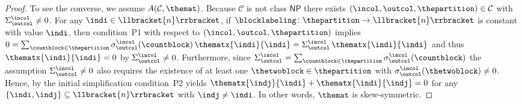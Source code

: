 \documentclass[10pt,a4paper]{amsart}
\numberwithin{equation}{section}
\newcommand{\dwi}[1]{\llbracket{#1}\rrbracket}
\newcommand{\xfromto}[3]{#1 \colon  #2 \to #3}
\newcommand{\tcsx}[2]{\Sigma^{#1}_{#2}}
\newcommand{\csx}[3]{\sigma^{#1}_{#2}(#3)}
\newcommand{\thedim}{n}
\newcommand{\thecat}{\mathcal{C}}
\newcommand{\thepredicatex}[2]{A(#1,#2)}
\newcommand{\conditionone}{P1}
\newcommand{\conditiontwo}{P2}
\newcommand{\onlyneutralpartitions}{\mathsf{NP}}
\begin{document}
{\begin{proof}
  To see the converse, we assume $\thepredicatex{\thecat}{\themat}$. Because $\thecat$ is not class $\onlyneutralpartitions$ there exists $(\incol,\outcol,\thepartition)\in\thecat$ with $\tcsx{\incol}{\outcol}\neq 0$.
For any $\indi\in\dwi{\thedim}$, if $\xfromto{\blocklabeling}{\thepartition}{\dwi{\thedim}}$ is constant with value $\indi$, then con\-di\-tion~\conditionone{} with respect to $(\incol,\outcol,\thepartition)$ implies $0=\sum_{\countblock\in\thepartition}\csx{\incol}{\outcol}{\countblock}\,\thematx{\indi}{\indi}=\tcsx{\incol}{\outcol}\,\thematx{\indi}{\indi}$ and thus $\thematx{\indi}{\indi}=0$ by $\tcsx{\incol}{\outcol}\neq 0$. Furthermore,
since $\tcsx{\incol}{\outcol}=\sum_{\countblock\in\thepartition}\csx{\incol}{\outcol}{\countblock}$ the assumption $\tcsx{\incol}{\outcol}\neq 0$ also requires the existence of at least one $\thetwoblock\in\thepartition$ with $\csx{\incol}{\outcol}{\thetwoblock}\neq 0$. Hence, by the initial simplification  con\-di\-tion~\conditiontwo{}  yields  $\thematx{\indj}{\indi}+\thematx{\indi}{\indj}=0$ for any $\{\indi,\indj\}\subseteq\dwi{\thedim}$ with $\indj\neq \indi$. In other words, $\themat$ is skew-symmetric.
\end{proof}

}
\end{document}
